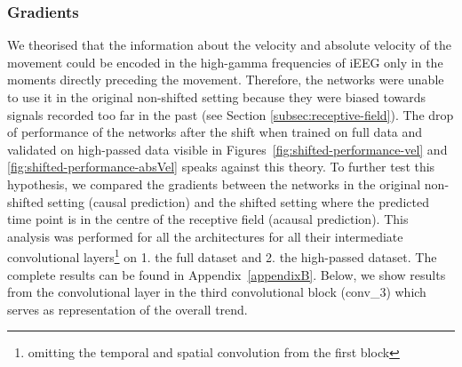 \subsubsection{Gradients}
We theorised that the information about the velocity and absolute velocity of the movement could be encoded in the high-gamma frequencies of iEEG only in the moments directly preceding the movement.
Therefore, the networks were unable to use it in the original non-shifted setting because they were biased towards signals recorded too far in the past (see Section \ref{subsec:receptive-field}).
The drop of performance of the networks after the shift when trained on full data and validated on high-passed data visible in Figures~\ref{fig:shifted-performance-vel} and \ref{fig:shifted-performance-absVel} speaks against this theory. 
To further test this hypothesis, we compared the gradients between the networks in the original non-shifted setting (causal prediction) and the shifted setting where the predicted time point is in the centre of the receptive field (acausal prediction).
This analysis was performed for all the architectures for all their intermediate convolutional layers\footnote{omitting the temporal and spatial convolution from the first block} on 1. the full dataset and 2. the high-passed dataset.
The complete results can be found in Appendix~\ref{appendixB}.
Below, we show results from the convolutional layer in the third convolutional block (conv\_3) which serves as representation of the overall trend. 

